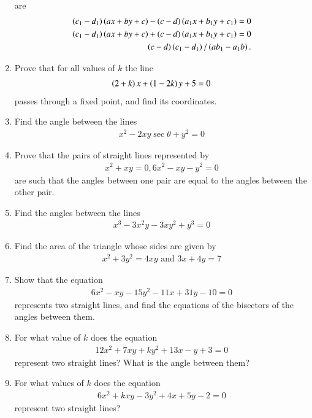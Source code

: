 \begin{enumerate}[label=\arabic*.,ref=\thesubsection.\theenumi]
are
{\small
\begin{align*}
\left(c_1-d_1\right)\left(ax+by+c\right)-\left(c-d\right)\left(a_1x+b_1y+c_1\right) = 0
\\
\left(c_1-d_1\right)\left(ax+by+c\right)+\left(c-d\right)\left(a_1x+b_1y+c_1\right) = 0
\\
\left(c-d\right)\left(c_1-d_1\right)/\left(ab_1-a_1b\right).
\end{align*}
}
\item Prove that for all values of $k$ the line
\begin{align*}
\left(2+k\right)x+\left(1-2k\right)y + 5 = 0
\end{align*}
passes through a fixed point, and find its coordinates.
\item Find the angle between the lines
\begin{align*}
x^2 - 2xy \sec \theta + y^2 = 0
\end{align*}
\item Prove that the pairs of straight lines represented by
\begin{align*}
x^2+xy = 0, 6x^2-xy-y^2 = 0
\end{align*}
are such that the angles between one pair are equal to the angles between the other pair.
\item Find the angles between the lines
\begin{align*}
x^3-3x^2y-3xy^2+y^3 = 0
\end{align*}
\item Find the area of the triangle whose sides are given by
\begin{align*}
x^2+3y^2 = 4xy \text{ and } 3x+4y=7
\end{align*}
\item Show that the equation
\begin{align*}
6x^2-xy-15y^2-11x+31y-10=0
\end{align*}
represents two straight lines, and find the equations of the bisectors of the angles between them.
\item For what value of $k$ does the equation
\begin{align*}
12x^2+7xy+ky^2+13x-y+3 = 0
\end{align*}
represent two straight lines? What is the angle between them?
\item For what values of $k$ does the equation
\begin{align*}
6x^2+kxy-3y^2+4x+5y-2 = 0
\end{align*}
represent two straight lines?
\end{enumerate}
